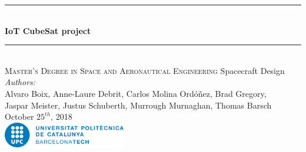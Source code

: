 
\begin{titlepage}

\newcommand{\HRule}{\rule{\linewidth}{0.5mm}} %

\center %


\HRule \\[0.2cm]
{ \Large \bfseries
IoT CubeSat project\\
}
\HRule \\[1.5cm]


\textsc{\large Master's Degree in Space and Aeronautical Engineering}
\large Spacecraft Design\\[0.8cm]

{ \textit{Authors:}\\
\normalsize Alvaro Boix,
Anne-Laure Debrit,
Carlos Molina Ordóñez,
Brad Gregory,\\
Jaspar Meister,
Justus Schuberth,
Murrough Murnaghan,
Thomas Barsch}\\[2cm]

{\normalsize October $25^{th}$, 2018}\\[2cm] %

\includegraphics[width=0.4\textwidth]{img/UPC_logo.jpg}\\[0.4cm]


\vfill %

\end{titlepage}
